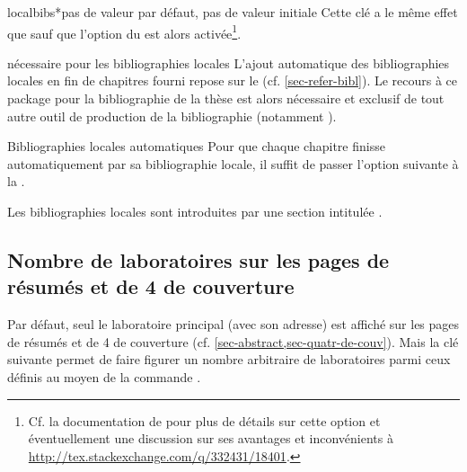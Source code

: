 \begin{docKey}[][doc new=2016-10-16]{localbibs*}{}{pas de valeur par défaut, pas
    de valeur initiale} 
  Cette clé a le même effet que  sauf que l'option
   du  est alors
  activée\footnote{Cf. la documentation de  pour plus de
    détails sur cette option et éventuellement une discussion sur ses avantages
    et inconvénients à \url{http://tex.stackexchange.com/q/332431/18401}.}.
\end{docKey}

\begin{dbwarning}{ nécessaire pour les bibliographies
    locales}{}
  L'ajout automatique des bibliographies locales en fin de chapitres fourni
  repose sur le  (cf. \vref{sec-refer-bibl}). Le recours à ce
  package pour la bibliographie de la thèse est alors nécessaire et exclusif de
  tout autre outil de production de la bibliographie (notamment
  ).%
\end{dbwarning}

\begin{dbexample}{Bibliographies locales automatiques}{}
  Pour que chaque chapitre finisse automatiquement par sa bibliographie locale,
  il suffit de passer l'option suivante à la \yatCl{}.
\end{dbexample}

Les bibliographies locales sont introduites par une section intitulée
.

\subsection{Nombre de laboratoires sur les pages de résumés et de 4\ieme{} de couverture}
\label{sec-nombre-de-labor}
%
%

Par défaut, seul le laboratoire principal (avec son adresse) est affiché sur les
pages de résumés et de 4\ieme{} de couverture (cf. \vref{sec-abstract,sec-quatr-de-couv}). Mais la clé
 suivante permet de faire figurer un nombre arbitraire
de laboratoires parmi ceux définis au moyen de la commande .%
%
%

